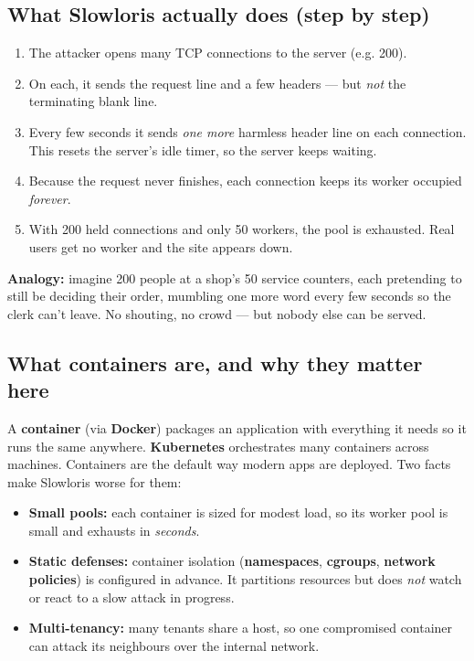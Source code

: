 \documentclass[11pt,a4paper]{article}
\newcommand{\term}[1]{\textbf{#1}}
\begin{document}
\subsection{What Slowloris actually does (step by step)}
\begin{enumerate}
  \item The attacker opens many TCP connections to the server (e.g. 200).
  \item On each, it sends the request line and a few headers --- but \emph{not}
  the terminating blank line.
  \item Every few seconds it sends \emph{one more} harmless header line on each
  connection. This resets the server's idle timer, so the server keeps waiting.
  \item Because the request never finishes, each connection keeps its worker
  occupied \emph{forever}.
  \item With 200 held connections and only 50 workers, the pool is exhausted.
  Real users get no worker and the site appears down.
\end{enumerate}
\textbf{Analogy:} imagine 200 people at a shop's 50 service counters, each
pretending to still be deciding their order, mumbling one more word every few
seconds so the clerk can't leave. No shouting, no crowd --- but nobody else can be
served.

\subsection{What containers are, and why they matter here}
A \term{container} (via \term{Docker}) packages an application with everything it
needs so it runs the same anywhere. \term{Kubernetes} orchestrates many containers
across machines. Containers are the default way modern apps are deployed. Two facts
make Slowloris worse for them:
\begin{itemize}
  \item \textbf{Small pools:} each container is sized for modest load, so its
  worker pool is small and exhausts in \emph{seconds}.
  \item \textbf{Static defenses:} container isolation (\term{namespaces},
  \term{cgroups}, \term{network policies}) is configured in advance. It partitions
  resources but does \emph{not} watch or react to a slow attack in progress.
  \item \textbf{Multi-tenancy:} many tenants share a host, so one compromised
  container can attack its neighbours over the internal network.
\end{itemize}
\end{document}
